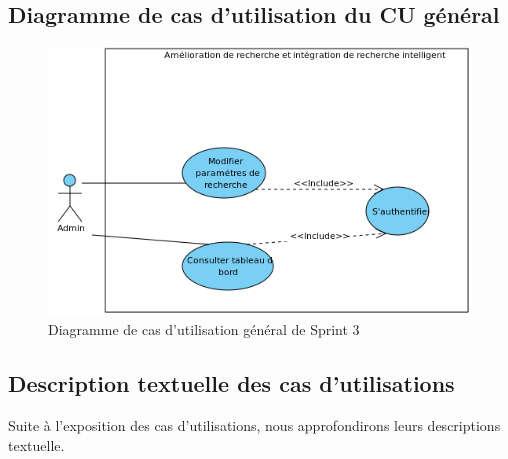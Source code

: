 \newpage
\subsection{Diagramme de cas d'utilisation du CU général}
\begin{figure}[H]
	\centering
	\includegraphics[width=1\textwidth]{logos/cusprint3.png}
	\caption{Diagramme de cas d'utilisation général de Sprint 3}
	\label{fig:cusprint3}
\end{figure}

\subsection{Description textuelle des cas d'utilisations}
\noindent
Suite à l'exposition des cas d'utilisations, nous approfondirons leurs descriptions textuelle.

